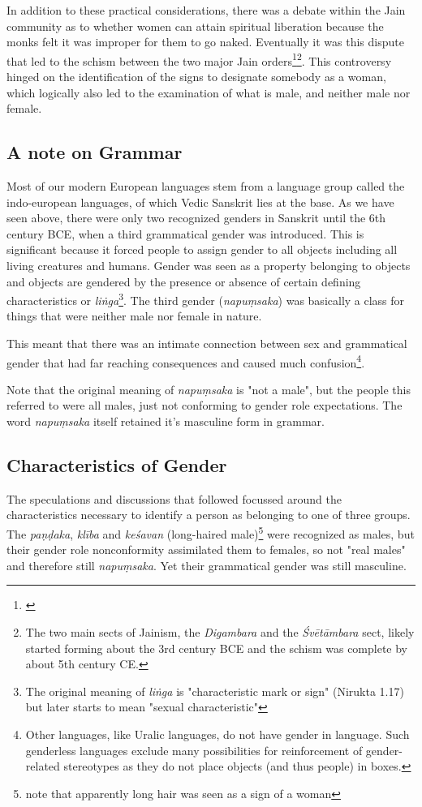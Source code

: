 In addition to these practical considerations, there was a debate within the Jain community as to whether women can attain spiritual liberation because the monks felt it was improper for them to go naked. Eventually it was this dispute that led to the schism between the two major Jain orders\footnote{\cite{dudas}}\footnote{The two main sects of Jainism, the {\em Digambara} and the {\em Śvētāmbara} sect, likely started forming about the 3rd century BCE and the schism was complete by about 5th century CE.}. This controversy hinged on the identification of the signs to designate somebody as a woman, which logically also led to the examination of what is male, and neither male nor female. 

\subsection{A note on Grammar}
Most of our modern European languages stem from a language group called the indo-european languages, of which Vedic Sanskrit lies at the base. As we have seen above, there were only two recognized genders in Sanskrit until the 6th century BCE, when a third grammatical gender was introduced. This is significant because it forced people to assign gender to all objects including all living creatures and humans. Gender was seen as a property belonging to objects and objects are gendered by the presence or absence of certain defining characteristics or {\em liṅga}\footnote{The original meaning of {\em liṅga} is "characteristic mark or sign" (Nirukta 1.17) but later starts to mean "sexual characteristic"}. The third gender ({\em napuṃsaka}) was basically a class for things that were neither male nor female in nature.

This meant that there was an intimate connection between sex and grammatical gender that had far reaching consequences and caused much confusion\footnote{Other languages, like Uralic languages, do not have gender in language. Such genderless languages exclude many possibilities for reinforcement of gender-related stereotypes as they do not place objects (and thus people) in boxes.}. 

Note that the original meaning of {\em napuṃsaka} is "not a male", but the people this referred to were all males, just not conforming to gender role expectations. The word {\em napuṃsaka} itself retained it's masculine form in grammar.

\subsection{Characteristics of Gender}
The speculations and discussions that followed focussed around the characteristics necessary to identify a person as belonging to one of three groups. The {\em paṇḍaka}, {\em klība} and {\em keśavan} (long-haired male)\footnote{note that apparently long hair was seen as a sign of a woman} were recognized as males, but their gender role nonconformity assimilated them to females, so not "real males" and therefore still {\em napuṃsaka}. Yet their grammatical gender was still masculine.

